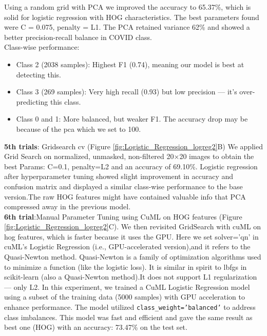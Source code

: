 \documentclass{article}
\begin{document}
Using a random grid with PCA we improved the accuracy to 65.37\%, which is solid for logistic regression with HOG characteristics. The best parameters found were C = 0.075, penalty = L1. The PCA retained variance 62\% and showed a better precision-recall balance in COVID class.\\
Class-wise performance: 
\begin{itemize}
    \item Class 2 (2038 samples): Highest F1 (0.74), meaning our model is best at detecting this.
    \item Class 3 (269 samples): Very high recall (0.93) but low precision — it’s over-predicting this class.
    \item Class 0 and 1: More balanced, but weaker F1.
The accuracy drop may be because of the pca which we set to 100.
\end{itemize}

\textbf{5th trials}: Gridsearch cv (Figure \ref{fig:Logistic_Regression_logreg2}B)
We applied Grid Search on normalized, unmasked, non-filtered 20×20 images to obtain the best Params: C=0.1, penalty=L2 and an accuracy of 69.10\%.
Logistic regression after hyperparameter tuning showed slight improvement in accuracy and confusion matrix and displayed a	similar class-wise performance to the base version.The raw HOG features might have contained valuable info that PCA compressed away in the previous model.
\\
\textbf{6th trial}:Manual Parameter Tuning using CuML on HOG features (Figure \ref{fig:Logistic_Regression_logreg2}C).
We then revisited GridSearch with cuML on hog features, which is faster because it uses the GPU.
Here we set solver='qn' in cuML's Logistic Regression (i.e., GPU-accelerated version),and it refers to the Quasi-Newton method.
Quasi-Newton is a family of optimization algorithms used to minimize a function (like the logistic loss).
It is similar in spirit to lbfgs in scikit-learn (also a Quasi-Newton method).It does not support L1 regularization — only L2.
In this experiment, we trained a CuML Logistic Regression model using a subset of the training data (5000 samples) with GPU acceleration to enhance performance. The model utilized \texttt{class\_weight='balanced'} to address class imbalances. This model was fast and efficient and gave the same result as best one (HOG) with an accuracy: 73.47\% on the test set.
\end{document}
